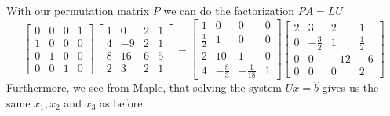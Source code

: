 \documentclass[12pt]{article}
\begin{document}
With our permutation matrix $P$ we can do the factorization $PA=LU$
$$
\begin{bmatrix}
0 & 0 & 0 & 1\\
1 & 0 & 0 & 0 \\
0 & 1 & 0 & 0 \\
0 & 0 & 1 & 0
\end{bmatrix}
\begin{bmatrix}
1 & 0 & 2 & 1\\
4 & -9 & 2 & 1 \\
8 & 16 & 6 & 5 \\
2 & 3 & 2 & 1
\end{bmatrix}
=
\begin{bmatrix}
1 & 0 & 0 & 0\\
\frac{1}{2} & 1 & 0 & 0 \\
2 & 10 & 1 & 0 \\
4 & -\frac{8}{3} & -\frac{1}{18} & 1
\end{bmatrix}
\begin{bmatrix}
2 & 3 & 2 & 1\\
0 & -\frac{3}{2} & 1 & \frac{1}{2} \\
0 & 0 & -12 & -6 \\
0 & 0 & 0 & 2
\end{bmatrix}
$$
Furthermore, we see from Maple, that solving the system $Ux=\hat{b}$ gives us the same $x_1,x_2$ and $x_3$ as before.
\end{document}
